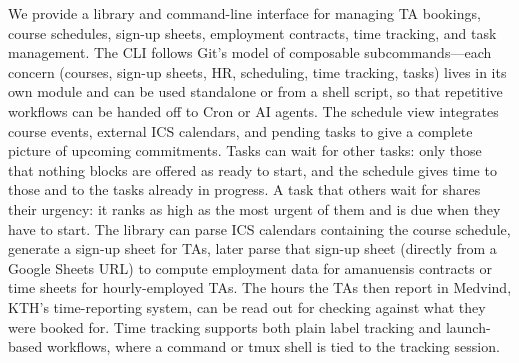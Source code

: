 We provide a library and command-line interface for managing TA bookings,
course schedules, sign-up sheets, employment contracts, time tracking, and
task management.
%
The CLI follows Git's model of composable subcommands---each concern
(courses, sign-up sheets, HR, scheduling, time tracking, tasks) lives in its
own module and can be used standalone or from a shell script, so that
repetitive workflows can be handed off to Cron or AI agents.
%
The schedule view integrates course events, external ICS calendars, and
pending tasks to give a complete picture of upcoming commitments.
%
Tasks can wait for other tasks: only those that nothing blocks are
offered as ready to start, and the schedule gives time to those and to
the tasks already in progress.  A task that others wait for shares their
urgency: it ranks as high as the most urgent of them and is due when
they have to start.
%
The library can parse ICS calendars containing the course schedule, generate a
sign-up sheet for TAs, later parse that sign-up sheet (directly from a Google
Sheets URL) to compute employment data for amanuensis contracts or time sheets
for hourly-employed TAs.
The hours the TAs then report in Medvind, KTH's time-reporting system,
can be read out for checking against what they were booked for.
%
Time tracking supports both plain label tracking and launch-based workflows,
where a command or tmux shell is tied to the tracking session.
